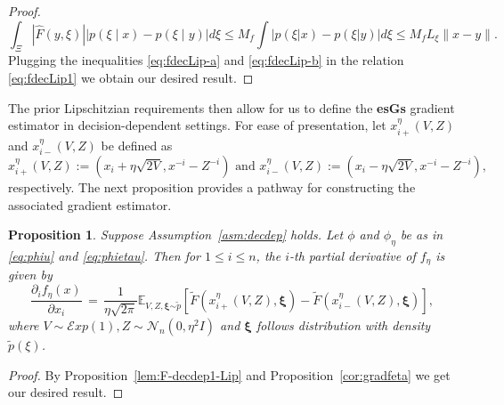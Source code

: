 \documentclass[11pt,reqno]{amsart}
\newcommand{\1}{{\bf 1}}
\newcommand{\2}{{\bf 2}}
\newcommand{\mr}[1]{{\color{blue}#1}}
\newcommand{\pc}[1]{{\color{cyan}#1}}
\newcommand{\us}[1]{\textcolor{red}{#1}}
\newcommand{\bxi}{\boldsymbol{\xi}}
\newcommand{\lln}{\left|}
\newcommand{\rrn}{\right|}
\numberwithin{equation}{section}
\newtheorem{proposition}{Proposition}[section]
\theoremstyle{remark}
\newcommand{\beq}{\begin{equation}}
\newcommand{\eeq}{\end{equation}}
\begin{document}
{{\begin{proof}
						\beq\label{eq:fdecLip-b}
						\int_\Xi\left|\hat{F}(y,\xi)\right|\left|p(\xi \mid x)-p(\xi \mid y)\right|d\xi \leq M_f \int \lln p(\xi | x) - p(\xi|y) \rrn d\xi \leq M_f L_\xi {\|x-y\|}.
						\eeq
						Plugging the inequalities \eqref{eq:fdecLip-a} and \eqref{eq:fdecLip-b} in the relation \eqref{eq:fdecLip1} we obtain our desired result.
						\end{proof}
						
						\medskip
						
						The prior Lipschitzian requirements then allow for us to define the {\bf esGs} gradient estimator in  decision-dependent settings. For ease of presentation, let $x_{i+}^\eta{(V,Z)}$ and $x_{i-}^\eta{(V,Z)}$ be defined as 
						\begin{equation}\label{eq:x_i+-}
							x_{i+}^\eta{(V,Z)}:=\left(x_i+\eta\sqrt{2V},x^{-i}-Z^{-i}\right) \mbox{ and }
							x_{i-}^\eta{(V,Z)}:=\left(x_i-\eta\sqrt{2V},x^{-i}-Z^{-i}\right),
						\end{equation}
						respectively. {The next} proposition {provides a pathway for constructing the associated gradient estimator}.
						\begin{proposition}
							Suppose Assumption~\ref{asm:decdep} holds. Let $\phi$ and $\phi_\eta$ be as in \eqref{eq:phiu} and \eqref{eq:phietau}. Then for $1 \leq i \leq n$, the $i$-th partial derivative of $f_\eta$ is given by
							\begin{equation}\label{eq:eta-grad-2}
								\frac{\partial_i f_{\eta}(x)}{\partial x_i} \,  = \, \frac{1}{\eta\sqrt{2\pi}}\mathbb{E}_{V,Z,\bxi {\sim \tilde{p}}}\left[\tilde{F}(x_{i+}^\eta(V,Z),\bxi)-\tilde{F}(x_{i-}^\eta(V,Z),\bxi)\right],
							\end{equation}
							where $V \sim \mathcal{E}xp(1),Z \sim \mathcal{N}_n(0,\eta^2 I)$ and $\bxi$ follows distribution with density $\tilde{p}(\xi)$.
						\end{proposition}
						\begin{proof}
						By Proposition~\ref{lem:F-decdep1-Lip} and Proposition~\ref{cor:gradfeta} we get our desired result.
						\end{proof}}
					
}
\end{document}
